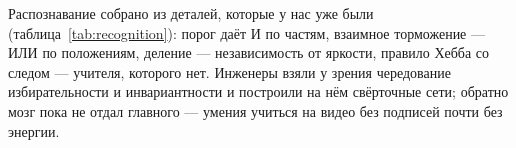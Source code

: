 Распознавание собрано из деталей, которые у нас уже были (таблица~\ref{tab:recognition}): порог даёт И по частям, взаимное торможение --- ИЛИ по положениям, деление --- независимость от яркости, правило Хебба со следом --- учителя, которого нет. Инженеры взяли у зрения чередование избирательности и инвариантности и построили на нём свёрточные сети; обратно мозг пока не отдал главного --- умения учиться на видео без подписей почти без энергии.

